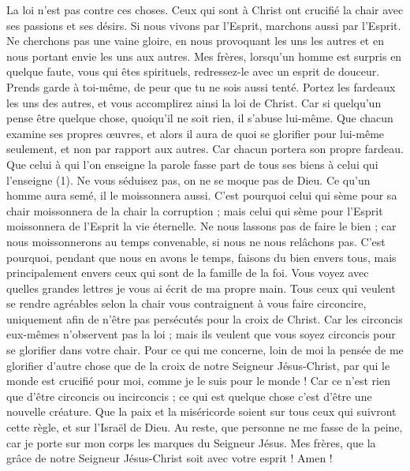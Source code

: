 \begin{multicols}{2}
La loi n’est pas contre ces choses.
Ceux qui sont à Christ ont crucifié la chair avec ses passions et ses désirs.
Si nous vivons par l'Esprit, marchons aussi par l'Esprit.
Ne cherchons pas une vaine gloire, en nous provoquant les uns les autres et en nous portant envie les uns aux autres.
\VerseOne{}Mes frères, lorsqu'un homme est surpris en quelque faute, vous qui êtes spirituels, redressez-le avec un esprit de douceur. Prends garde à toi-même, de peur que tu ne sois aussi tenté.
Portez les fardeaux les uns des autres, et vous accomplirez ainsi la loi de Christ.
Car si quelqu'un pense être quelque chose, quoiqu'il ne soit rien, il s’abuse lui-même.
Que chacun examine ses propres œuvres, et alors il aura de quoi se glorifier pour lui-même seulement, et non par rapport aux autres.
Car chacun portera son propre fardeau.
Que celui à qui l’on enseigne la parole fasse part de tous ses biens à celui qui l'enseigne (1).
Ne vous séduisez pas, on ne se moque pas de Dieu. Ce qu’un homme aura semé, il le moissonnera aussi.
C'est pourquoi celui qui sème pour sa chair moissonnera de la chair la corruption ; mais celui qui sème pour l'Esprit moissonnera de l'Esprit la vie éternelle.
Ne nous lassons pas de faire le bien ; car nous moissonnerons au temps convenable, si nous ne nous relâchons pas.
C'est pourquoi, pendant que nous en avons le temps, faisons du bien envers tous, mais principalement envers ceux qui sont de la famille de la foi.
Vous voyez avec quelles grandes lettres je vous ai écrit de ma propre main.
Tous ceux qui veulent se rendre agréables selon la chair vous contraignent à vous faire circoncire, uniquement afin de n’être pas persécutés pour la croix de Christ.
Car les circoncis eux-mêmes n’observent pas la loi ; mais ils veulent que vous soyez circoncis pour se glorifier dans votre chair.
Pour ce qui me concerne, loin de moi la pensée de me glorifier d’autre chose que de la croix de notre Seigneur Jésus-Christ, par qui le monde est crucifié pour moi, comme je le suis pour le monde !
Car ce n’est rien que d’être circoncis ou incirconcis ; ce qui est quelque chose c’est d’être une nouvelle créature.
Que la paix et la miséricorde soient sur tous ceux qui suivront cette règle, et sur l'Israël de Dieu.
\TextTitle{[Conclusion]}
Au reste, que personne ne me fasse de la peine, car je porte sur mon corps les marques du Seigneur Jésus.
Mes frères, que la grâce de notre Seigneur Jésus-Christ soit avec votre esprit ! Amen !
\PPE{}
\end{multicols}
